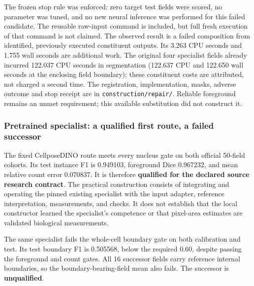 The frozen stop rule was enforced: zero target test fields were scored, no parameter was tuned, and no new neural inference was performed for this failed candidate. The reusable raw-input command is included, but full fresh execution of that command is not claimed. The observed result is a failed composition from identified, previously executed constituent outputs. Its 3.263 CPU seconds and 1.755 wall seconds are additional work. The original four specialist fields already incurred 122.037 CPU seconds in segmentation (122.637 CPU and 122.650 wall seconds at the enclosing field boundary); these constituent costs are attributed, not charged a second time. The registration, implementation, masks, adverse outcome and stop receipt are in \texttt{construction/repair/}. Reliable foreground remains an unmet requirement; this available substitution did not construct it.

\subsubsection{Pretrained specialist: a qualified first route, a failed successor}

The fixed CellposeDINO route meets every nucleus gate on both official 50-field cohorts. Its test instance F1 is 0.949103, foreground Dice 0.967232, and mean relative count error 0.070837. It is therefore \textbf{qualified for the declared source research contract}. The practical construction consists of integrating and operating the pinned existing specialist with the input adapter, reference interpretation, measurements, and checks. It does not establish that the local constructor learned the specialist's competence or that pixel-area estimates are validated biological measurements.

The same specialist fails the whole-cell boundary gate on both calibration and test. Its test boundary F1 is 0.505568, below the required 0.60, despite passing the foreground and count gates. All 16 successor fields carry reference internal boundaries, so the boundary-bearing-field mean also fails. The successor is \textbf{unqualified}.

